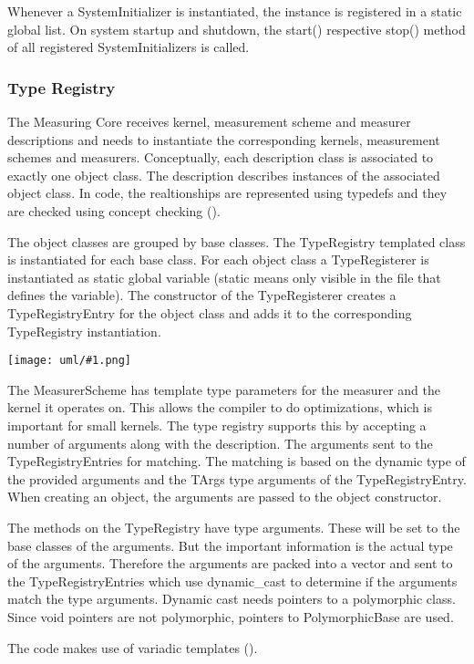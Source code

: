 \documentclass[a4paper,12pt]{article}
\newcommand{\umlDiagram}[1]{\begin{center}\texttt{[image: uml/\#1.png]}\end{center}}
\begin{document}
Whenever a SystemInitializer is instantiated, the instance is registered in a static global list. On system startup and shutdown, the start() respective stop() method of all registered SystemInitializers is called.

\subsubsection{Type Registry}
The Measuring Core receives kernel, measurement scheme and measurer descriptions and needs to instantiate the corresponding kernels, measurement schemes and measurers. Conceptually, each description class is associated to exactly one object class. The description describes instances of the associated object class. In code, the realtionships are represented using typedefs and they are checked using concept checking (\cite{siek01_concept_check}).

The object classes are grouped by base classes. The TypeRegistry templated class is instantiated for each base class. For each object class a TypeRegisterer is instantiated as static global variable (static means only visible in the file that defines the variable). The constructor of the TypeRegisterer creates a TypeRegistryEntry for the object class and adds it to the corresponding TypeRegistry instantiation.

\umlDiagram{TypeRegistry}

The MeasurerScheme has template type parameters for the measurer and the kernel it operates on. This allows the compiler to do optimizations, which is important for small kernels. The type registry supports this by accepting a number of arguments along with the description. The arguments sent to the TypeRegistryEntries for matching. The matching is based on the dynamic type of the provided arguments and the TArgs type arguments of the TypeRegistryEntry. When creating an object, the arguments are passed to the object constructor.

The methods on the TypeRegistry have type arguments. These will be set to the base classes of the arguments. But the important information is the actual type of the arguments. Therefore the arguments are packed into a vector and sent to the TypeRegistryEntries which use dynamic\_cast to determine if the arguments match the type arguments. Dynamic cast needs pointers to a polymorphic class. Since void pointers are not polymorphic, pointers to PolymorphicBase are used.

The code makes use of variadic templates (\cite{Gregor06:variadics_rev_3}).
\end{document}
